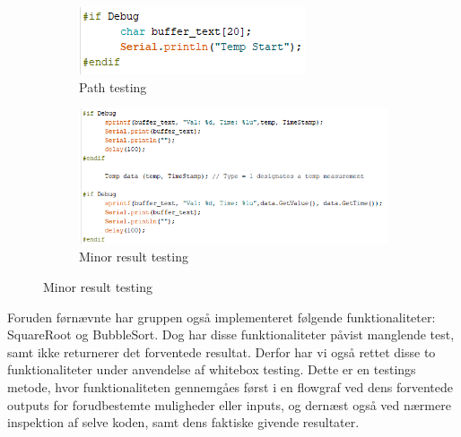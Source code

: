 \documentclass[11pt]{article}
\begin{document}
    \begin{figure}[H]
        \begin{subfigure}{.4\textwidth}
            \centering
            \includegraphics[width=1\linewidth]{Struktureret_System_Udvikling/Workshop_3/Assets/Start.PNG}
            \caption{Path testing}
            \label{fig:TestPath}
        \end{subfigure}
        \begin{subfigure}{.6\textwidth}
            \centering
            \includegraphics[width=1\linewidth]{Struktureret_System_Udvikling/Workshop_3/Assets/Secound.PNG}
            \caption{Minor result testing}
            \label{fig:TestRes}
        \end{subfigure}
        \label{fig:Testing}
    \end{figure}
    
    
    \noindent
    Foruden førnævnte har gruppen også implementeret følgende funktionaliteter:
    SquareRoot og BubbleSort.
    Dog har disse funktionaliteter påvist manglende test, samt ikke returnerer det forventede resultat. Derfor har vi også rettet disse to funktionaliteter under anvendelse af whitebox testing. Dette er en testings metode, hvor funktionaliteten gennemgåes først i en flowgraf ved dens forventede outputs for forudbestemte muligheder eller inputs, og dernæst også ved nærmere inspektion af selve koden, samt dens faktiske givende resultater.
    
\end{document}
